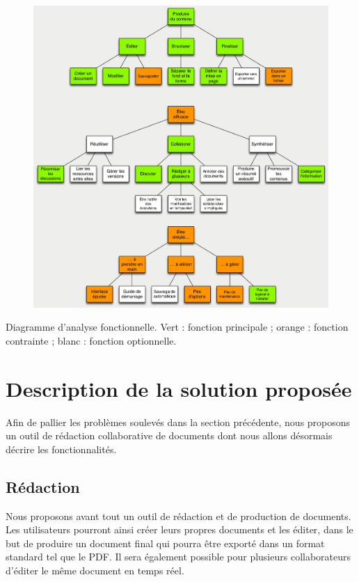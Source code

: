 \documentclass[10pt,twocolumn,a4paper,utf8x]{article}
\begin{document}
\begin{figure}[htbp]
\includegraphics[width=\hsize]{analyse-fonctionnelle.png}
\end{figure}

Diagramme d'analyse fonctionnelle. Vert : fonction principale ; orange :
fonction contrainte ; blanc : fonction optionnelle.

\section{Description de la solution proposée}

Afin de pallier les problèmes soulevés dans la section précédente, nous
proposons un outil de rédaction collaborative de documents dont nous
allons désormais décrire les fonctionnalités.

\subsection{Rédaction}

Nous proposons avant tout un outil de rédaction et de production de
documents. Les utilisateurs pourront ainsi créer leurs propres documents
et les éditer, dans le but de produire un document final qui pourra être
exporté dans un format standard tel que le PDF. Il sera également
possible pour plusieurs collaborateurs d'éditer le même document en
temps réel.
\end{document}
